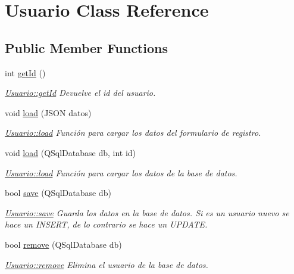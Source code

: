 \hypertarget{classUsuario}{}\section{Usuario Class Reference}
\label{classUsuario}
\subsection*{Public Member Functions}
\begin{DoxyCompactItemize}
\item 
int \mbox{\hyperlink{classUsuario_af72cadb2cfa815ef3318f2544d1df4ef}{get\+Id}} ()
\begin{DoxyCompactList}\small\item\em \mbox{\hyperlink{classUsuario_af72cadb2cfa815ef3318f2544d1df4ef}{Usuario\+::get\+Id}} Devuelve el id del usuario. \end{DoxyCompactList}\item 
void \mbox{\hyperlink{classUsuario_a99d91848f5937e76640798e9dadabc5f}{load}} (J\+S\+ON datos)
\begin{DoxyCompactList}\small\item\em \mbox{\hyperlink{classUsuario_a99d91848f5937e76640798e9dadabc5f}{Usuario\+::load}} Función para cargar los datos del formulario de registro. \end{DoxyCompactList}\item 
void \mbox{\hyperlink{classUsuario_abc771f3aad5fac378fff2b2fda9e77f7}{load}} (Q\+Sql\+Database db, int id)
\begin{DoxyCompactList}\small\item\em \mbox{\hyperlink{classUsuario_a99d91848f5937e76640798e9dadabc5f}{Usuario\+::load}} Función para cargar los datos de la base de datos. \end{DoxyCompactList}\item 
bool \mbox{\hyperlink{classUsuario_a11bb14b70194d87b80fd192d5d0a65fa}{save}} (Q\+Sql\+Database db)
\begin{DoxyCompactList}\small\item\em \mbox{\hyperlink{classUsuario_a11bb14b70194d87b80fd192d5d0a65fa}{Usuario\+::save}} Guarda los datos en la base de datos. Si es un usuario nuevo se hace un I\+N\+S\+E\+RT, de lo contrario se hace un U\+P\+D\+A\+TE. \end{DoxyCompactList}\item 
bool \mbox{\hyperlink{classUsuario_a23251d116c77cfa0ce32fee22b60ae10}{remove}} (Q\+Sql\+Database db)
\begin{DoxyCompactList}\small\item\em \mbox{\hyperlink{classUsuario_a23251d116c77cfa0ce32fee22b60ae10}{Usuario\+::remove}} Elimina el usuario de la base de datos. \end{DoxyCompactList}\item 

\end{DoxyCompactItemize}
